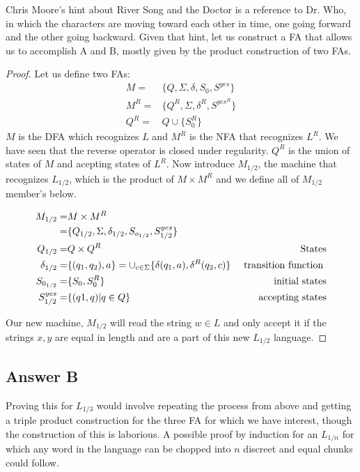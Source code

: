 \documentclass[titlepage]{article}\usepackage[]{graphicx}\usepackage[]{color}
\begin{document}
Chris Moore's hint about River Song and the Doctor is a reference to Dr. Who,
in which the characters are moving toward each other in time, one going
forward and the other going backward. Given that hint, let us construct a FA
that allows us to accomplish A and B, mostly given by the product construction
of two FAs.

\begin{proof}
	Let us define two FAs:
	\begin{align}
		M =& \{Q, \Sigma, \delta, S_0, S^{yes}\} \\
		M^R =& \{ Q^R, \Sigma, \delta^R, S^{yes^R} \} \\
		Q^R = & Q \cup \{S_{0}^R \}
	\end{align}
	$M$ is the DFA which recognizes $L$ and $M^R$ is the NFA that recognizes
	$L^R$. We have seen that the reverse operator is closed under
	regularity. $Q^R$ is the union of states of $M$ and acepting states of
	$L^R$.
        Now introduce $M_{1/2}$, the machine that recognizes $L_{1/2}$, which
        is the product of $M \times M^R$ and we define all of $M_{1/2}$
        member's below.
        
        \begin{align}
          M_{1/2} = & M \times M^R \\ = &  \{ Q_{1/2}, \Sigma, \delta_{1/2}, S_{o_{1/2}}, S_{1/2}^{yes}  \} & \\
          Q_{1/2} = & Q \times Q^R \hfill & \text{States} \\ 
          \delta_{1/2} = & \{ (q_1, q_2), a\} = \cup_{c \in \Sigma} \{ \delta (q_1, a), \delta^R (q_2, c)\} &\text{ transition function }\\ 
          S_{0_{1/2}} = & \{ S_0, S_0^R \} & \text{ initial states} \\
          S^{yes}_{1/2} = & \{ (q1,q) | q \in Q \} & \text{ accepting states}
	\end{align}

        Our new machine, $M_{1/2}$ will read the string $w \in L$ and only
        accept it if the strings $x,y$ are equal in length and are a part of
        this new $L_{1/2}$ language. 
\end{proof}

\subsection{Answer B}
Proving this for $L_{1/3}$ would involve repeating the process from above and
getting a triple product construction for the three FA for which we have
interest, though the construction of this is laborious. 
A possible proof by induction for an $L_{1/n}$ for which any word in the
language can be chopped into $n$ discreet and equal chunks could follow. 
\end{document}

